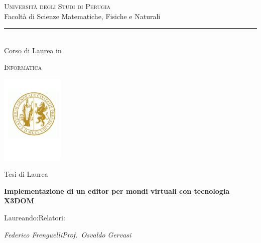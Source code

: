 \documentclass[a4paper,12pt]{report}
\title{\begin{large}\textbf{\titolotesi}\end{large}}
\author{\laureando}
\def\titolotesi{Implementazione di un editor per mondi virtuali con tecnologia X3DOM}
\def\laureando{Federico Frenguelli}
\begin{document}
\begin{titlepage}
\begin{center}
\textsc{\Large Universit\`{a} degli Studi di Perugia}\medskip\\

{\Large Facolt\`{a} di Scienze Matematiche, Fisiche e Naturali}\medskip\\

\rule{10mm}{0.01mm}\medskip\\

{\small Corso di Laurea in }\medskip

\textsc{Informatica}\medskip\\


\vspace*{3mm}

\includegraphics[width=3cm]{logounipg.png}

\vspace*{3mm}

\Large Tesi di Laurea \par\bigskip



{\large \bf \titolotesi \par}

\bigskip\bigskip\bigskip\bigskip\bigskip\bigskip

\end{center}\par

\hspace{0.1cm}Laureando:\hspace{7.3cm}Relatori:\par

\hspace{0.0cm}\emph{\laureando}\hfill\emph{Prof.~Osvaldo Gervasi}\par


\end{titlepage}
\end{document}
